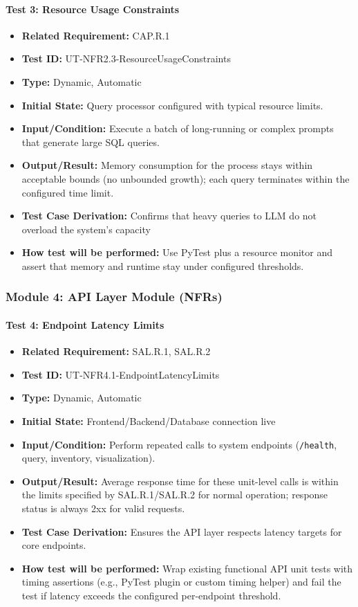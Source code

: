 \documentclass[12pt, titlepage]{article}
\begin{document}
\begin{flushleft}
\paragraph{Test 3: Resource Usage Constraints}
\begin{itemize}
    \item \textbf{Related Requirement:} CAP.R.1
    \item \textbf{Test ID:} UT-NFR2.3-ResourceUsageConstraints
    \item \textbf{Type:} Dynamic, Automatic
    \item \textbf{Initial State:} Query processor configured with typical resource limits.
    \item \textbf{Input/Condition:} Execute a batch of long-running or complex prompts that generate large SQL queries.
    \item \textbf{Output/Result:} Memory consumption for the process stays within acceptable bounds (no unbounded growth); each query terminates within the configured time limit.
    \item \textbf{Test Case Derivation:} Confirms that heavy queries to LLM do not overload the system's capacity
    \item \textbf{How test will be performed:} Use PyTest plus a resource monitor and assert that memory and runtime stay under configured thresholds.
\end{itemize}

\subsubsection{Module 4: API Layer Module (NFRs)}

\paragraph{Test 4: Endpoint Latency Limits}
\begin{itemize}
    \item \textbf{Related Requirement:} SAL.R.1, SAL.R.2
    \item \textbf{Test ID:} UT-NFR4.1-EndpointLatencyLimits
    \item \textbf{Type:} Dynamic, Automatic
    \item \textbf{Initial State:} Frontend/Backend/Database connection live
    \item \textbf{Input/Condition:} Perform repeated calls to system endpoints (\texttt{/health}, query, inventory, visualization).
    \item \textbf{Output/Result:} Average response time for these unit-level calls is within the limits specified by SAL.R.1/SAL.R.2 for normal operation; response status is always 2xx for valid requests.
    \item \textbf{Test Case Derivation:} Ensures the API layer respects latency targets for core endpoints.
    \item \textbf{How test will be performed:} Wrap existing functional API unit tests with timing assertions (e.g., PyTest plugin or custom timing helper) and fail the test if latency exceeds the configured per-endpoint threshold.
\end{itemize}


\end{flushleft}
\end{document}

